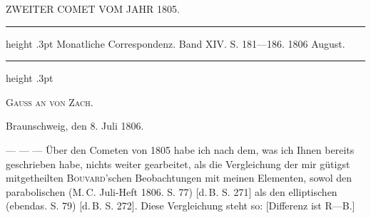 \par\bigskip
{}
\hypertarget{native-280-lower}{}
\begin{center}\large ZWEITER COMET VOM JAHR 1805.\end{center}
\begin{center}\parbox{.84\linewidth}{\centering\footnotesize\frenchspacing
\hrule height .3pt\relax\vspace{2.5pt}
Monatliche Correspondenz. Band XIV. S. 181—186. 1806 August.\par
\vspace{2.5pt}\hrule height .3pt\relax
}\end{center}

\begin{center}
\textsc{Gauss an von Zach.}
\end{center}

\begin{flushright}
Braunschweig, den 8. Juli 1806.
\end{flushright}

\noindent --- --- --- Über den Cometen von 1805 habe ich nach dem, was ich Ihnen bereits geschrieben habe, nichts weiter gearbeitet, als die Vergleichung der mir gütigst mitgetheilten \textsc{Bouvard}'schen Beobachtungen mit meinen Elementen, sowol den parabolischen (M.\,C. Juli-Heft 1806. S. 77) [d.\,B. S. 271] als den elliptischen (ebendas. S. 79) [d.\,B. S. 272]. Diese Vergleichung steht so: [Differenz ist R---B.]

